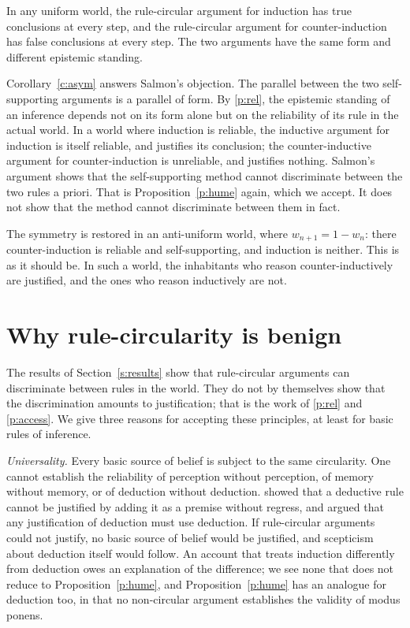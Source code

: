 \documentclass{situationist-preprint}
\begin{document}
\begin{corollary}\label{c:asym}
In any uniform world, the rule-circular argument for induction has true conclusions at every step, and the rule-circular argument for counter-induction has false conclusions at every step. The two arguments have the same form and different epistemic standing.
\end{corollary}

Corollary~\ref{c:asym} answers Salmon's objection. The parallel between the two self-supporting arguments is a parallel of form. By \ref{p:rel}, the epistemic standing of an inference depends not on its form alone but on the reliability of its rule in the actual world. In a world where induction is reliable, the inductive argument for induction is itself reliable, and justifies its conclusion; the counter-inductive argument for counter-induction is unreliable, and justifies nothing. Salmon's argument shows that the self-supporting method cannot discriminate between the two rules a priori. That is Proposition~\ref{p:hume} again, which we accept. It does not show that the method cannot discriminate between them in fact.

The symmetry is restored in an anti-uniform world, where $w_{n+1} = 1 - w_n$: there counter-induction is reliable and self-supporting, and induction is neither. This is as it should be. In such a world, the inhabitants who reason counter-inductively are justified, and the ones who reason inductively are not.

\section{Why rule-circularity is benign}\label{s:benign}

The results of Section~\ref{s:results} show that rule-circular arguments can discriminate between rules in the world. They do not by themselves show that the discrimination amounts to justification; that is the work of \ref{p:rel} and \ref{p:access}. We give three reasons for accepting these principles, at least for basic rules of inference.

\emph{Universality.} Every basic source of belief is subject to the same circularity. One cannot establish the reliability of perception without perception, of memory without memory, or of deduction without deduction. \citet{Carroll1895} showed that a deductive rule cannot be justified by adding it as a premise without regress, and \citet{Haack1976} argued that any justification of deduction must use deduction. If rule-circular arguments could not justify, no basic source of belief would be justified, and scepticism about deduction itself would follow. An account that treats induction differently from deduction owes an explanation of the difference; we see none that does not reduce to Proposition~\ref{p:hume}, and Proposition~\ref{p:hume} has an analogue for deduction too, in that no non-circular argument establishes the validity of modus ponens.
\end{document}
